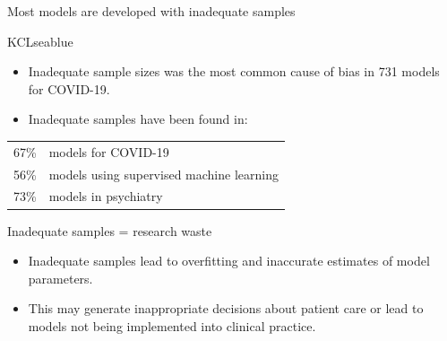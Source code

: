 \documentclass[11pt]{beamer}
\begin{document}
\begin{frame}[t]{Most models are developed with inadequate samples}




	\begin{cbox}{KCLseablue}{}
		\large
		\begin{itemize}
			\item Inadequate sample sizes was the most common cause of bias
			      in 731 models for COVID-19.\autocite{wynants2020}
			\item Inadequate samples have been found in: \vspace{0.5em}
		\end{itemize}
		\begin{tabular}{rl}
			{\huge \alert{67\%}} & models for COVID-19\autocite{wynants2020}                      \\[0.5em]
			{\huge \alert{56\%}} & models using supervised machine learning\autocite{navarro2021} \\[0.5em]
			{\huge \alert{73\%}} & models in psychiatry\autocite{meehan2022}                      \\[0.3em]
		\end{tabular}
	\end{cbox}

Inadequate samples = research waste

	\begin{itemize}
		\item Inadequate samples lead to overfitting and inaccurate estimates
		      of model parameters.


		\item This may generate inappropriate decisions about patient care or
		      lead to models not being implemented into clinical practice.


\end{itemize}
\end{frame}
\end{document}
